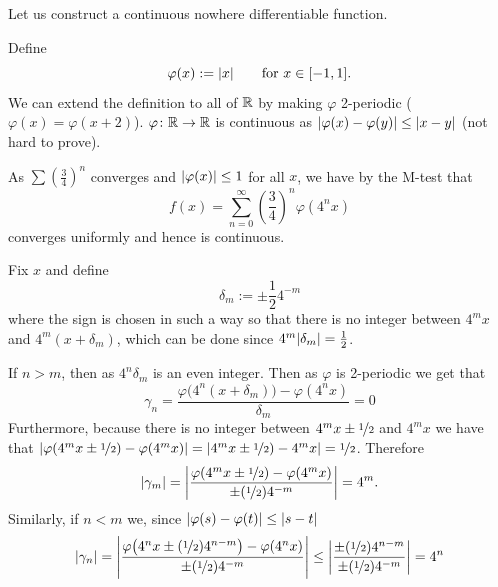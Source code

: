 \begin{example}
Let us construct a continuous nowhere differentiable function.

Define
\begin{equation*}
\varphi(x) :=\lvert {x} \rvert \qquad \text{for $x \in [-1,1]$} .
\end{equation*}
We can extend the definition to all of ${\mathbb{R}}$ by making $\varphi$ 2-periodic
($\varphi(x) = \varphi(x+2)$).  $\varphi \colon {\mathbb{R}} \to {\mathbb{R}}$
is continuous as $\lvert {\varphi(x)-\varphi(y)} \rvert \leq \lvert {x-y} \rvert$ (not hard to
prove).

As $\sum {\left(\frac{3}{4}\right)}^n$ converges and $\lvert {\varphi(x)} \rvert \leq
1$ for all $x$, we have by the M-test that
\begin{equation*}
f(x) = \sum_{n=0}^\infty 
{\left(\frac{3}{4}\right)}^n \varphi(4^n x)
\end{equation*}
converges uniformly and hence is continuous.

Fix $x$ and
define
\begin{equation*}
\delta_m := \pm \frac{1}{2} 4^{-m}
\end{equation*}
where the sign is chosen in such a way so that there is no integer
between $4^m x$ and $4^m(x+\delta_m)$, which can be done
since $4^m\lvert {\delta_m} \rvert = \frac{1}{2}$.

If $n > m$, then as $4^n\delta_m$ is an even integer.  Then as $\varphi$
is 2-periodic we get that
\begin{equation*}
\gamma_n =
\frac{\varphi\bigl(4^n(x+\delta_m)\bigr)-\varphi(4^nx)}{\delta_m} = 0
\end{equation*}
Furthermore, because there is no integer between 
$4^mx\pm\nicefrac{1}{2}$ and $4^mx$ we have that
$\left\lvert {\varphi(4^mx\pm\nicefrac{1}{2})-\varphi(4^mx)} \right\rvert =
\left\lvert {4^mx\pm\nicefrac{1}{2})-4^mx} \right\rvert = \nicefrac{1}{2}$.  Therefore
\begin{equation*}
\lvert {\gamma_m} \rvert =
\left\lvert {
\frac{\varphi(4^mx\pm\nicefrac{1}{2})-\varphi(4^mx)}{\pm (\nicefrac{1}{2}) 4^{-m}}
} \right\rvert
= 4^m .
\end{equation*}
Similarly, if $n < m$ we, since $\lvert {\varphi(s) -\varphi(t)} \rvert \leq \lvert {s-t} \rvert$
\begin{equation*}
\lvert {\gamma_n} \rvert =
\left\lvert {\frac{\varphi\bigl(4^nx\pm(\nicefrac{1}{2})4^{n-m}\bigr)-\varphi(4^nx)}{\pm
(\nicefrac{1}{2}) 4^{-m}}} \right\rvert
\leq
\left\lvert {\frac{\pm(\nicefrac{1}{2})4^{n-m}}{\pm (\nicefrac{1}{2}) 4^{-m}}} \right\rvert = 4^n
\end{equation*}


\end{example}
